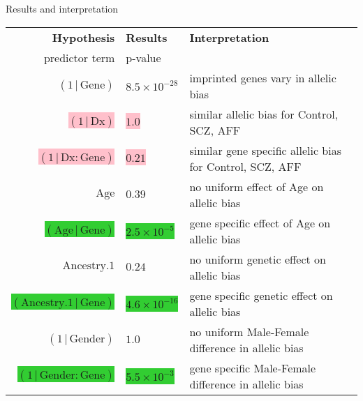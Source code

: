 \documentclass[usenames,dvipsnames]{beamer}
\begin{document}
\begin{frame}{Results and interpretation}
\footnotesize
\begin{tabular}{rll}
\hline
\textbf{Hypothesis}                      & \textbf{Results}             & \textbf{Interpretation}                               \\
predictor term                             & p-value                &                                              \\
\hline
\((1\,|\,\mathrm{Gene})\)                   & \(8.5\times 10^{-28}\) & imprinted genes vary in allelic bias     \\
\colorbox{pink}{\((1\,|\,\mathrm{Dx})\)}                     & \colorbox{pink}{\(1.0\)}                & similar allelic bias for Control, SCZ, AFF \\
\colorbox{pink}{\((1\,|\,\mathrm{Dx}:\mathrm{Gene})\)}       & \colorbox{pink}{\(0.21\)}               & similar gene specific allelic bias for Control, SCZ, AFF    \\
\(\mathrm{Age}\)                            & \(0.39\)               & no uniform effect of Age on allelic bias               \\
\colorbox{LimeGreen}{\((\mathrm{Age}\,|\,\mathrm{Gene})\)}        & \colorbox{LimeGreen}{\(2.5\times 10^{-5}\)}  & gene specific effect of Age on allelic bias                \\
\(\mathrm{Ancestry.1}\)                     & \(0.24\)               & no uniform genetic effect on allelic bias               \\
\colorbox{LimeGreen}{\((\mathrm{Ancestry.1}\,|\,\mathrm{Gene})\)} & \colorbox{LimeGreen}{\(4.6\times 10^{-16}\)} & gene specific genetic effect on allelic bias               \\ %
\((1\,|\,\mathrm{Gender})\)                 & \(1.0\)                & no uniform Male-Female difference in allelic bias       \\
\colorbox{LimeGreen}{\((1\,|\,\mathrm{Gender}:\mathrm{Gene})\)}   & \colorbox{LimeGreen}{\(5.5\times 10^{-3}\)}  & gene specific Male-Female difference in allelic bias       \\
\hline
\end{tabular}
\end{frame}
\end{document}
